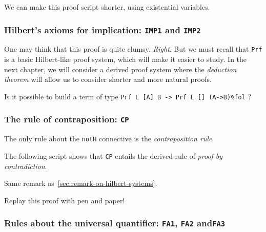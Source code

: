We can make this proof script shorter, using existential variables.



\subsubsection{Hilbert's axioms for implication: \texttt{IMP1} and \texttt{IMP2}}


\label{proof:PrfEx3}

\begin{remark}
\label{sec:remark-on-hilbert-systems}
One may think that this proof 
is quite clumsy. \emph{Right}.
But we must recall that \texttt{Prf} is a basic Hilbert-like
proof system, which will make it easier to study.
In the next chapter, we will consider a derived proof system 
where the \emph{deduction theorem} will allow us to consider shorter and more natural proofs.
\end{remark}

\begin{exercise}[**]
  Is it possible to build a term of type
\texttt{Prf L [A] B -> Prf L [] (A->B)\%fol} ?
\end{exercise}

\subsubsection{The rule of contraposition: \texttt{CP}}

The only rule about the \texttt{notH} connective is
the \emph{contraposition rule}.



The following script shows that \texttt{CP} entails the 
derived rule of \emph{proof by contradiction}.

\label{prfex4}


\begin{remark}
Same remark as~\ref{sec:remark-on-hilbert-systems}.
\end{remark}

\begin{exercise}
  Replay this proof with pen and paper!
\end{exercise}


\subsubsection{Rules about the universal quantifier: \texttt{FA1},
\texttt{FA2} and\texttt{FA3}}


